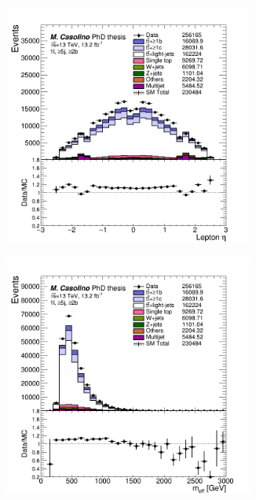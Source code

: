 \begin{figure}[p]
\begin{subfigure}{0.33\textwidth}
  \caption{}
  \label{}
\end{subfigure}
\begin{subfigure}{0.33\textwidth}
  \centering
  \includegraphics[width=0.9\textwidth]{figures/VLQ/presel/1lep/canv_c1l2b_lep0_eta.png}
  \caption{}
  \label{}
\end{subfigure}
\begin{subfigure}{0.33\textwidth}
  \centering
  \includegraphics[width=0.9\textwidth]{figures/VLQ/presel/1lep/canv_c1l2b_meff.png}

\end{subfigure}
\end{figure}

